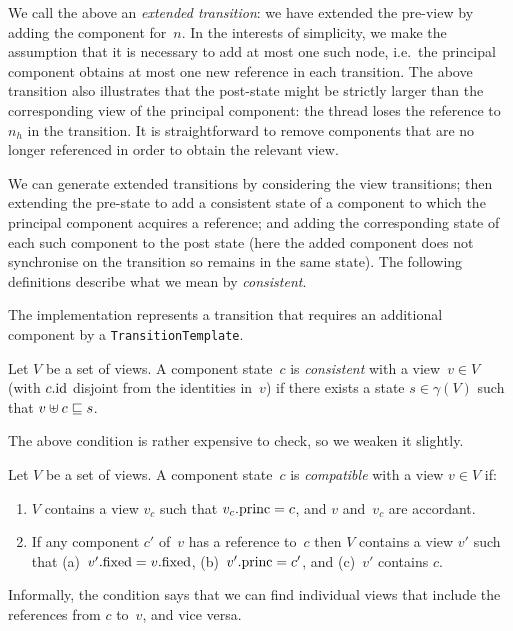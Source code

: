 %
%
We call the above an \emph{extended transition}: we have extended the pre-view
by adding the component for~$n$.  In the interests of simplicity, we make the
assumption that it is necessary to add at most one such node, i.e.~the
principal component obtains at most one new reference in each transition.
The above transition also illustrates that the post-state might be strictly
larger than the corresponding view of the principal component: the thread
loses the reference to~$n_h$ in the transition.  It is straightforward to remove
components that are no longer referenced in order to obtain the relevant view.

We can generate extended transitions by considering the view transitions; then
extending the pre-state to add a consistent state of a component to which the
principal component acquires a reference; and adding the corresponding state
of each such component to the post state (here the added component does not
synchronise on the transition so remains in the same state).  The following
definitions describe what we mean by \emph{consistent}.

\begin{impNote}
The implementation represents a transition that requires an
  additional component by a \texttt{TransitionTemplate}.
\end{impNote}

\begin{definition}
Let $V$ be a set of views.  A component state~$c$ is \emph{consistent} with a
view~$v \in V$ (with $c.\mathrm{id}$ disjoint from the identities in~$v$) if there
exists a state $s \in \gamma(V)$ such that $v \uplus c \sqsubseteq s$.
\end{definition}
%
The above condition is rather expensive to check, so we weaken it slightly. 
%
\begin{definition}
\label{def:compatible}
Let $V$ be a set of views.  A component state~$c$ is \emph{compatible} with a
view $v \in V$ if:
%
\begin{enumerate}
\item\label{item:compatible-1} $V$ contains a view $v_c$ such that $v_c.\mathrm{princ}
  = c$, and $v$ and~$v_c$ are accordant.


\item\label{item:compatible-2} If any component $c'$ of~$v$ has a reference
  to~$c$ then $V$ contains a view $v'$ such that (a)~$v'.\mathrm{fixed} = v.\mathrm{fixed}$,
  (b)~$v'.\mathrm{princ} = c'$, and (c)~$v'$ contains $c$.
\end{enumerate}
\end{definition}
%
Informally, the condition says that we can find individual views that include
the references from $c$ to~$v$, and vice versa. 

